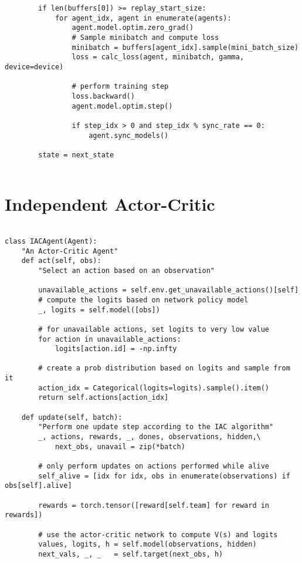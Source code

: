 \begin{appendices}
\begin{verbatim}
        if len(buffers[0]) >= replay_start_size:
            for agent_idx, agent in enumerate(agents):
                agent.model.optim.zero_grad()
                # Sample minibatch and compute loss
                minibatch = buffers[agent_idx].sample(mini_batch_size)
                loss = calc_loss(agent, minibatch, gamma, device=device)

                # perform training step 
                loss.backward()
                agent.model.optim.step()

                if step_idx > 0 and step_idx % sync_rate == 0:
                    agent.sync_models()

        state = next_state


\end{verbatim}

\chapter{Independent Actor-Critic}
\label{app:iac}
\begin{verbatim}

class IACAgent(Agent):
    "An Actor-Critic Agent"
    def act(self, obs):
        "Select an action based on an observation"

        unavailable_actions = self.env.get_unavailable_actions()[self]
        # compute the logits based on network policy model
        _, logits = self.model([obs])
        
        # for unavailable actions, set logits to very low value
        for action in unavailable_actions:
            logits[action.id] = -np.infty
        
        # create a prob distribution based on logits and sample from it
        action_idx = Categorical(logits=logits).sample().item()
        return self.actions[action_idx]

    def update(self, batch):
        "Perform one update step according to the IAC algorithm"
        _, actions, rewards, _, dones, observations, hidden,\ 
            next_obs, unavail = zip(*batch)
        
        # only perform updates on actions performed while alive
        self_alive = [idx for idx, obs in enumerate(observations) if obs[self].alive]

        rewards = torch.tensor([reward[self.team] for reward in rewards])
        
        # use the actor-critic network to compute V(s) and logits
        values, logits, h = self.model(observations, hidden) 
        next_vals, _, _   = self.target(next_obs, h)
        

\end{verbatim}
\end{appendices}
